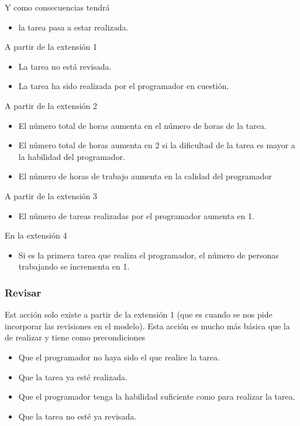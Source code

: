 \documentclass[12pt, titlepage]{article}
\begin{document}
Y como consecuencias tendrá
\begin{itemize}
    \item la tarea pasa a estar realizada.
\end{itemize}
A partir de la extensión 1
\begin{itemize}
    \item La tarea no está revisada.
    \item La tarea ha sido realizada por el programador en cuestión.
\end{itemize}
A partir de la extensión 2
\begin{itemize}
    \item El número total de horas aumenta en el número de horas de la tarea.
    \item El número total de horas aumenta en 2 si la dificultad de la tarea es
        mayor a la habilidad del programador.
    \item El número de horas de trabajo aumenta en la calidad del programador   
\end{itemize}
A partir de la extensión 3
\begin{itemize}
    \item El número de tareas realizadas por el programador aumenta en 1.
\end{itemize}
En la extensión 4
\begin{itemize}
    \item Si es la primera tarea que realiza el programador, el número de
        personas trabajando se incrementa en 1.
\end{itemize}

\subsubsection{Revisar}
Est acción solo existe a partir de la extensión 1 (que es cuando se nos pide
incorporar las revisiones en el modelo). Esta acción es mucho más básica que la
de realizar y tiene como precondiciones
\begin{itemize}
    \item Que el programador no haya sido el que realice la tarea.
    \item Que la tarea ya esté realizada.
    \item Que el programador tenga la habilidad suficiente como para realizar la
        tarea.
    \item Que la tarea no esté ya revisada.
\end{itemize}
\end{document}
